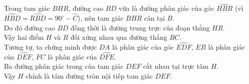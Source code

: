 \begin{bt}
{\begin{enumerate}[a)]
	Trong tam giác $BHR$, đường cao $BD$ vừa là đường phân giác của góc $\widehat{HBR}$ (vì $\widehat{HBD} = \widehat{RBD} = 90^\circ - \widehat{C}$), nên tam giác $BHR$ cân tại $B$.\\
	Do đó đường cao $BD$ đồng thời là đường trung trực của đoạn thẳng $HR$.\\
	Vậy hai điểm $H$ và $R$ đối xứng nhau qua đường thẳng $BC$.\\
	Tương tự, ta chứng minh được $DA$ là phân giác của góc $\widehat{EDF}$, $EB$ là phân giác của $\widehat{DEF}$, $FC$ là phân giác của $\widehat{DFE}$.\\
	Ba đường phân giác trong của tam giác $DEF$ cắt nhau tại trực tâm $H$.\\
	Vậy $H$ chính là tâm đường tròn nội tiếp tam giác $DEF$.
\end{enumerate}
}
\end{bt}
